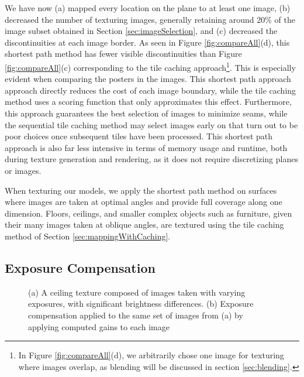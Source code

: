 \documentclass[]{spie}  %
\begin{document}
We have now (a) mapped every location on the plane to at least one
image, (b) decreased the number of texturing images, generally
retaining around 20\% of the image subset obtained in Section
\ref{sec:imageSelection}, and (c) decreased the discontinuities at
each image border. As seen in Figure \ref{fig:compareAll}(d), this
shortest path method has fewer visible discontinuities than Figure
\ref{fig:compareAll}(c) corresponding to the tile caching
approach\footnote{In Figure \ref{fig:compareAll}(d), we arbitrarily
  chose one image for texturing where images overlap, as blending will
  be discussed in section \ref{sec:blending}.}. This is especially
evident when comparing the posters in the images. This shortest path
approach approach directly reduces the cost of each image boundary,
while the tile caching method uses a scoring function that only
approximates this effect. Furthermore, this approach guarantees the
best selection of images to minimize seams, while the sequential tile
caching method may select images early on that turn out to be poor
choices once subsequent tiles have been processed. This shortest path
approach is also far less intensive in terms of memory usage and
runtime, both during texture generation and rendering, as it does not
require discretizing planes or images.

When texturing our models, we apply the shortest path method on
surfaces where images are taken at optimal angles and provide full
coverage along one dimension. Floors, ceilings, and smaller complex
objects such as furniture, given their many images taken at oblique
angles, are textured using the tile caching method of Section
\ref{sec:mappingWithCaching}.

\subsection{Exposure Compensation}
\label{sec:exposureCompensation}

\begin{figure}
  \centering
  \hspace{0.5in}
  \caption{(a) A ceiling texture composed of images taken with varying
    exposures, with significant brightness differences. (b) Exposure
    compensation applied to the same set of images from (a) by
    applying computed gains to each image}
  \label{fig:exposureDiff}
\end{figure}
\end{document}
